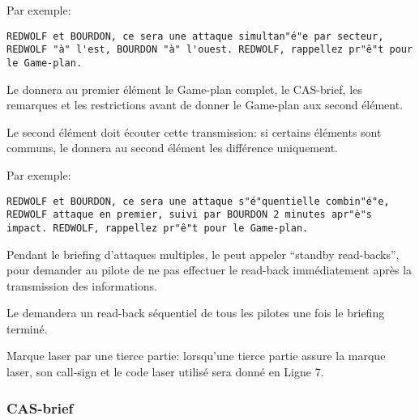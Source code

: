 \begin{e1}
\begin{e2}
\begin{e3}
\begin{minipage}{\linewidth}
				Par exemple:
				
				\begin{lstlisting}[caption=Game-plan: attaque par secteurs, label=gameplansector]
	REDWOLF et BOURDON, ce sera une attaque simultan"é"e par secteur, REDWOLF "à" l'est, BOURDON "à" l'ouest. REDWOLF, rappellez pr"ê"t pour le Game-plan.
				\end{lstlisting}
			\end{minipage}
			
		\end{e3}
		\begin{minipage}{\linewidth}
		\item Le \ja{} donnera au premier élément le Game-plan complet, le CAS-brief, les remarques et les restrictions avant de donner le Game-plan aux second élément.
		
		Le second élément doit écouter cette transmission: si certains éléments sont communs, le \ja{} donnera au second élément les différence uniquement.
		
		Par exemple:
		
		\begin{lstlisting}[caption=Game-plan: game-plan commun, label=gameplancommon]
	REDWOLF et BOURDON, ce sera une attaque s"é"quentielle combin"é"e, REDWOLF attaque en premier, suivi par BOURDON 2 minutes apr"è"s impact. REDWOLF, rappellez pr"ê"t pour le Game-plan.
		\end{lstlisting}
		\end{minipage}
		
		\item Pendant le briefing d'attaques multiples, le \ja{} peut appeler ``standby read-backs'', pour demander au pilote de ne pas effectuer le read-back immédiatement après la transmission des informations.
		
		Le \ja{} demandera un read-back séquentiel de tous les pilotes une fois le briefing terminé.
		
		\item Marque laser par une tierce partie: lorsqu'une tierce partie assure la marque laser, son call-sign et le code laser utilisé sera donné en Ligne 7.
		
		
	\end{e2}
	
\end{e1}

\subsubsection{CAS-brief}%

